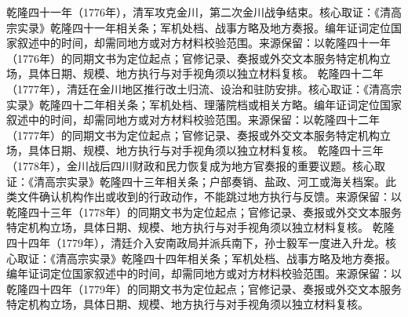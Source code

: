 乾隆四十一年（1776年），清军攻克金川，第二次金川战争结束。核心取证：《清高宗实录》乾隆四十一年相关条；军机处档、战事方略及地方奏报。编年证词定位国家叙述中的时间，却需同地方或对方材料校验范围。来源保留：以乾隆四十一年（1776年）的同期文书为定位起点；官修记录、奏报或外交文本服务特定机构立场，具体日期、规模、地方执行与对手视角须以独立材料复核。
乾隆四十二年（1777年），清廷在金川地区推行改土归流、设治和驻防安排。核心取证：《清高宗实录》乾隆四十二年相关条；军机处档、理藩院档或相关方略。编年证词定位国家叙述中的时间，却需同地方或对方材料校验范围。来源保留：以乾隆四十二年（1777年）的同期文书为定位起点；官修记录、奏报或外交文本服务特定机构立场，具体日期、规模、地方执行与对手视角须以独立材料复核。
乾隆四十三年（1778年），金川战后四川财政和民力恢复成为地方官奏报的重要议题。核心取证：《清高宗实录》乾隆四十三年相关条；户部奏销、盐政、河工或海关档案。此类文件确认机构作出或收到的行政动作，不能跳过地方执行与反馈。来源保留：以乾隆四十三年（1778年）的同期文书为定位起点；官修记录、奏报或外交文本服务特定机构立场，具体日期、规模、地方执行与对手视角须以独立材料复核。
乾隆四十四年（1779年），清廷介入安南政局并派兵南下，孙士毅军一度进入升龙。核心取证：《清高宗实录》乾隆四十四年相关条；军机处档、战事方略及地方奏报。编年证词定位国家叙述中的时间，却需同地方或对方材料校验范围。来源保留：以乾隆四十四年（1779年）的同期文书为定位起点；官修记录、奏报或外交文本服务特定机构立场，具体日期、规模、地方执行与对手视角须以独立材料复核。
